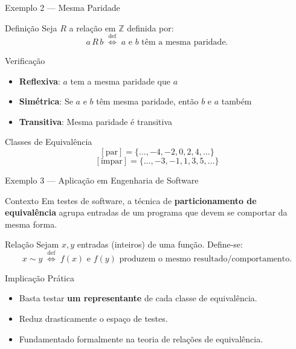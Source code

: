 \documentclass[9pt]{beamer}
\begin{document}
\begin{frame}{Exemplo 2 — Mesma Paridade}

\begin{block}{Definição}
Seja $R$ a relação em $\mathbb{Z}$ definida por:
\[
a\,R\,b \;\stackrel{\text{def}}{\Longleftrightarrow}\; a \text{ e } b \text{ têm a mesma paridade.}
\]
\end{block}

\begin{block}{Verificação}
\begin{itemize}
  \item \textbf{Reflexiva}: $a$ tem a mesma paridade que $a$ \checkmark
  \item \textbf{Simétrica}: Se $a$ e $b$ têm mesma paridade, então $b$ e $a$ também \checkmark
  \item \textbf{Transitiva}: Mesma paridade é transitiva \checkmark
\end{itemize}
\end{block}

\begin{block}{Classes de Equivalência}
\[
[\text{par}] = \{\dots,-4,-2,0,2,4,\dots\}
\]
\[
[\text{ímpar}] = \{\dots,-3,-1,1,3,5,\dots\}
\]
\end{block}

\end{frame}

\begin{frame}{Exemplo 3 — Aplicação em Engenharia de Software}

\begin{block}{Contexto}
Em testes de software, a técnica de \textbf{particionamento de equivalência} agrupa entradas de um programa que devem se comportar da mesma forma.
\end{block}

\begin{block}{Relação}
Sejam $x, y$ entradas (inteiros) de uma função. Define-se:
\[
x \sim y \;\stackrel{\text{def}}{\Longleftrightarrow}\; f(x) \text{ e } f(y) \text{ produzem o mesmo resultado/comportamento}.
\]
\end{block}

\begin{block}{Implicação Prática}
\begin{itemize}
  \item Basta testar \textbf{um representante} de cada classe de equivalência.
  \item Reduz drasticamente o espaço de testes.
  \item Fundamentado formalmente na teoria de relações de equivalência.
\end{itemize}
\end{block}

\end{frame}
\end{document}
